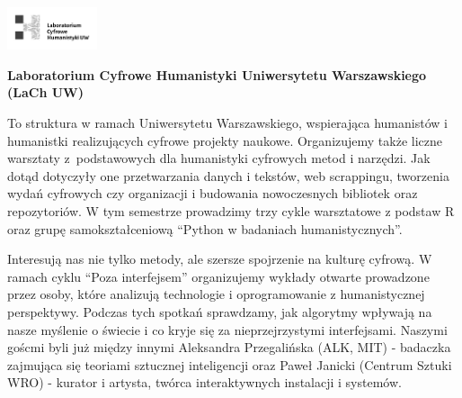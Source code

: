 \documentclass[\main/boa.tex]{subfiles}
\begin{document}
	
	\begin{minipage}[t]{0.915\textwidth}
		\center     
		\includegraphics[width=100px]{img/logos.bw/lach.png} 
	\end{minipage}
	\begin{center}
	\Large \textbf {Laboratorium Cyfrowe Humanistyki Uniwersytetu Warszawskiego (LaCh UW)}
	\end{center}
	
	\vskip 0.3cm
	\normalsize 
	To struktura w ramach Uniwersytetu Warszawskiego, wspierająca humanistów i humanistki realizujących cyfrowe projekty naukowe. Organizujemy także liczne warsztaty z~podstawowych dla humanistyki cyfrowych metod i narzędzi. Jak dotąd dotyczyły one przetwarzania danych i tekstów, web scrappingu, tworzenia wydań cyfrowych czy organizacji i budowania nowoczesnych bibliotek oraz repozytoriów. W tym semestrze prowadzimy trzy cykle warsztatowe z podstaw R oraz grupę samokształceniową “Python w badaniach humanistycznych”.
	
	Interesują nas nie tylko metody, ale szersze spojrzenie na kulturę cyfrową. W ramach cyklu “Poza interfejsem” organizujemy wykłady otwarte prowadzone przez osoby, które analizują technologie i oprogramowanie z humanistycznej perspektywy. Podczas tych spotkań sprawdzamy, jak algorytmy wpływają na nasze myślenie o świecie i co kryje się za nieprzejrzystymi interfejsami. Naszymi goścmi byli już między innymi Aleksandra Przegalińska (ALK, MIT) - badaczka zajmująca się teoriami sztucznej inteligencji oraz Paweł Janicki (Centrum Sztuki WRO) - kurator i artysta, twórca interaktywnych instalacji i systemów.
	
	\vskip 1.5cm
\end{document}
